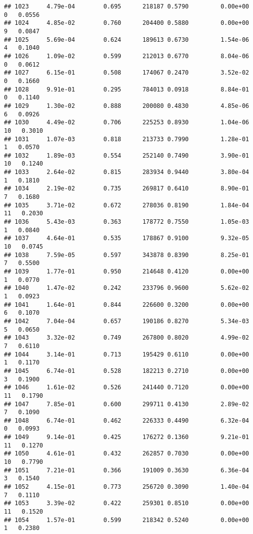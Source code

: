 \documentclass[
]{article}
\begin{document}
\begin{verbatim}
## 1023     4.79e-04        0.695      218187 0.5790         0.00e+00   0   0.0556
## 1024     4.85e-02        0.760      204400 0.5880         0.00e+00   9   0.0847
## 1025     5.69e-04        0.624      189613 0.6730         1.54e-06   4   0.1040
## 1026     1.09e-02        0.599      212013 0.6770         8.04e-06   0   0.0612
## 1027     6.15e-01        0.508      174067 0.2470         3.52e-02   0   0.1660
## 1028     9.91e-01        0.295      784013 0.0918         8.84e-01   0   0.1140
## 1029     1.30e-02        0.888      200080 0.4830         4.85e-06   6   0.0926
## 1030     4.49e-02        0.706      225253 0.8930         1.04e-06  10   0.3010
## 1031     1.07e-03        0.818      213733 0.7990         1.28e-01   1   0.0570
## 1032     1.89e-03        0.554      252140 0.7490         3.90e-01  10   0.1240
## 1033     2.64e-02        0.815      283934 0.9440         3.80e-04   1   0.1810
## 1034     2.19e-02        0.735      269817 0.6410         8.90e-01   7   0.1680
## 1035     3.71e-02        0.672      278036 0.8190         1.84e-04  11   0.2030
## 1036     5.43e-03        0.363      178772 0.7550         1.05e-03   1   0.0840
## 1037     4.64e-01        0.535      178867 0.9100         9.32e-05  10   0.0745
## 1038     7.59e-05        0.597      343878 0.8390         8.25e-01   7   0.5500
## 1039     1.77e-01        0.950      214648 0.4120         0.00e+00   1   0.0770
## 1040     1.47e-02        0.242      233796 0.9600         5.62e-02   1   0.0923
## 1041     1.64e-01        0.844      226600 0.3200         0.00e+00   6   0.1070
## 1042     7.04e-04        0.657      190186 0.8270         5.34e-03   5   0.0650
## 1043     3.32e-02        0.749      267800 0.8020         4.99e-02   7   0.6110
## 1044     3.14e-01        0.713      195429 0.6110         0.00e+00   1   0.1170
## 1045     6.74e-01        0.528      182213 0.2710         0.00e+00   3   0.1900
## 1046     1.61e-02        0.526      241440 0.7120         0.00e+00  11   0.1790
## 1047     7.85e-01        0.600      299711 0.4130         2.89e-02   7   0.1090
## 1048     6.74e-01        0.462      226333 0.4490         6.32e-04   0   0.0993
## 1049     9.14e-01        0.425      176272 0.1360         9.21e-01  11   0.1270
## 1050     4.61e-01        0.432      262857 0.7030         0.00e+00  10   0.7790
## 1051     7.21e-01        0.366      191009 0.3630         6.36e-04   3   0.1540
## 1052     4.15e-01        0.773      256720 0.3090         1.40e-04   7   0.1110
## 1053     3.39e-02        0.422      259301 0.8510         0.00e+00  11   0.1520
## 1054     1.57e-01        0.599      218342 0.5240         0.00e+00   1   0.2380

\end{verbatim}
\end{document}
